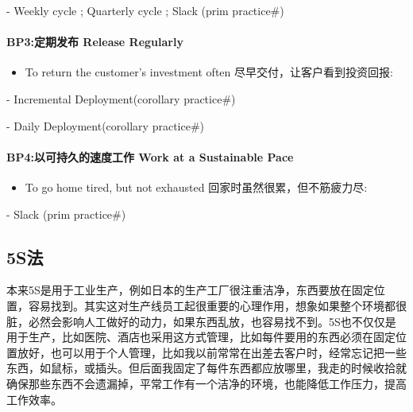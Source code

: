 \begin{description}
\tightlist
\item[]
- Weekly cycle ; Quarterly cycle ; Slack (prim practice\#)
\end{description}

\hypertarget{bp3ux5b9aux671fux53d1ux5e03-release-regularly}{%
\paragraph{BP3:定期发布 Release
Regularly}\label{bp3ux5b9aux671fux53d1ux5e03-release-regularly}}

\begin{itemize}
\tightlist
\item
  To return the customer's investment often
  尽早交付，让客户看到投资回报:
\end{itemize}

\begin{description}
\tightlist
\item[]
- Incremental Deployment(corollary practice\#)

- Daily Deployment(corollary practice\#)
\end{description}

\hypertarget{bp4ux4ee5ux53efux6301ux4e45ux7684ux901fux5ea6ux5de5ux4f5c-work-at-a-sustainable-pace}{%
\paragraph{BP4:以可持久的速度工作 Work at a Sustainable
Pace}\label{bp4ux4ee5ux53efux6301ux4e45ux7684ux901fux5ea6ux5de5ux4f5c-work-at-a-sustainable-pace}}

\begin{itemize}
\tightlist
\item
  To go home tired, but not exhausted 回家时虽然很累，但不筋疲力尽:\\
\end{itemize}

\begin{description}
\tightlist
\item[]
- Slack (prim practice\#)
\end{description}

\hypertarget{sux6cd5}{%
\subsection{5S法}\label{sux6cd5}}

本来5S是用于工业生产，例如日本的生产工厂很注重洁净，东西要放在固定位置，容易找到。其实这对生产线员工起很重要的心理作用，想象如果整个环境都很脏，必然会影响人工做好的动力，如果东西乱放，也容易找不到。5S也不仅仅是用于生产，比如医院、酒店也采用这方式管理，比如每件要用的东西必须在固定位置放好，也可以用于个人管理，比如我以前常常在出差去客户时，经常忘记把一些东西，如鼠标，或插头。但后面我固定了每件东西都应放哪里，我走的时候收拾就确保那些东西不会遗漏掉，平常工作有一个洁净的环境，也能降低工作压力，提高工作效率。

